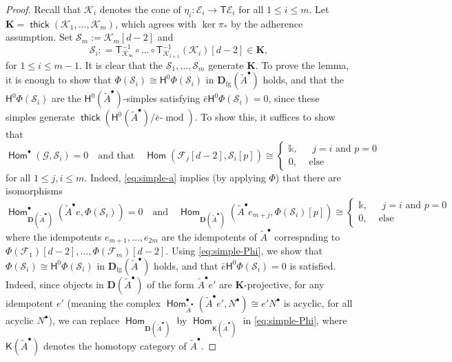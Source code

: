 \documentclass[a4paper,11pt, reqno]{amsart}
\def\DD{\mathbf D}
\def\KK{\mathbf K}
\def\sE{\mathscr{E}}
\def\sF{\mathscr{F}}
\def\sG{\mathscr{G}}
\def\sK{\mathscr{K}}
\def\sS{\mathscr{S}}
\def\mod{{\operatorname{mod}}}
\newcommand{\opname}[1]{\operatorname{\mathsf{#1}}}
\newcommand{\Hom}{\opname{Hom}}
\newcommand{\thick}{\opname{thick}\nolimits}
\newcommand{\bH}{\mathsf{H}}
\newcommand{\bK}{\mathsf{K}}
\newcommand{\bT}{\mathsf{T}}
\theoremstyle{plain}
\theoremstyle{definition}
\numberwithin{equation}{section}
\begin{document}
\begin{proof}
    Recall that $\sK_i $ denotes the cone of $\eta_{i} \colon \sE_i \to \bT \sE_i$ for all $1\leq i \leq m$. Let $\KK = \thick ( \sK_1  , \ldots , \sK_{m})$, which agrees with $\ker \pi_\ast$ by the adherence assumption.
    Set $\sS_m := \sK_{m} [d-2] $ and
    \[
    \sS_i : = \bT_{\sK_{m}}^{-1} \circ \ldots \circ \bT^{-1}_{\sK_{i+1}} ( \sK_{i} ) [d-2] \in \KK ,
    \]
    for $1 \leq i \leq m -1$.
      It is clear that the $\sS_1 , \ldots , \sS_{m}$ generate $\KK$.
    To prove the lemma, it is enough to show  that $\Phi ( \sS_i ) \cong \bH^0 \Phi ( \sS_i )$ in $\DD_{\mathrm{fg}}( \tilde{A}^\bullet )$ holds, and that the $\bH^0 \Phi ( \sS_i )$ are the $\bH^0 ( \tilde{A}^\bullet )$-simples 
    satisfying $\bar{e} \bH^0 \Phi ( \sS_i )  = 0$, since these simples
    generate $\thick ( \bH^0( \tilde{A}^\bullet ) / \bar{e} \mbox{-} \mod)$.
    To show this, it suffices to show that 
 \begin{equation}\label{eq:simple-a}
     \Hom^\bullet ( \sG , \sS_i  ) = 0 \quad \text{and that} \quad 
         \Hom ( \sF_{j} [d-2] , \sS_i [p  ] ) \cong 
        \begin{cases}
\mathbb k, &\text{ $j= i$ and $p=0$}\\
0 , &\text{ else}
\end{cases}
 \end{equation}
 for all $1\leq j , i \leq m$.
 Indeed, \eqref{eq:simple-a} implies (by applying $\Phi$) that there are isomorphisms  
 \begin{equation}\label{eq:simple-Phi}
     \Hom^\bullet_{\DD( \tilde{A}^\bullet)} (  \tilde{A}^\bullet e , \Phi (\sS_i ) ) = 0 \quad \text{and} \quad 
         \Hom_{\DD ( \tilde{A}^\bullet )} (  \tilde{A}^\bullet e_{m+j} , \Phi ( \sS_i ) [p  ] ) \cong 
        \begin{cases}
\mathbb k, &\text{ $j= i$ and $p=0$}\\
0 , &\text{ else}
\end{cases}
 \end{equation}
 where the idempotents $e_{m+1} , \ldots , e_{2m}$ are the idempotents of $\tilde{A}^\bullet$ correspnding to $\Phi ( \sF_1 ) [d-2] , \ldots , \Phi ( \sF_m ) [d-2]$.
 Using \eqref{eq:simple-Phi}, we show that $\Phi ( \sS_i ) \cong \bH^0 \Phi ( \sS_i )$ in $\DD_{\mathrm{fg}}( \tilde{A}^\bullet )$ holds, and that  $\bar{e} \bH^0 \Phi ( \sS_i )  = 0$ is satisfied.
 Indeed, 
 since objects in $\DD ( \tilde{A}^\bullet  )$ of the form $ \tilde{A}^\bullet e'$ are $\KK$-projective, for any idempotent $e'$ (meaning the complex $\Hom^\bullet_{\tilde{A}^\bullet}(\tilde{A}^\bullet e' , N^\bullet ) \cong e' N^\bullet $ is acyclic, for all acyclic $N^\bullet$), we can replace $\Hom_{\DD ( \tilde{A}^\bullet )}$ by $\Hom_{\bK (\tilde{A}^\bullet )}$ in \eqref{eq:simple-Phi}, where $\bK (\tilde{A}^\bullet )$ denotes the homotopy category of $\tilde{A}^\bullet$.

\end{proof}
\end{document}
